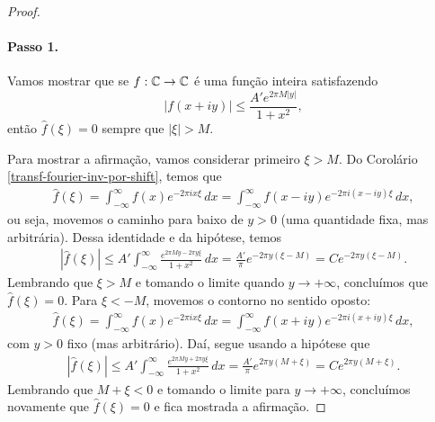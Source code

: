 \begin{proof}
            \paragraph{Passo 1.} Vamos mostrar que se $f:\mathbb{C}\to\mathbb{C}$ é uma
            função inteira satisfazendo
            \begin{equation*}
                |f(x+iy)| \leq \frac{A'e^{2\pi M|y|}}{1+x^2},
            \end{equation*}
            então $\widehat{f}(\xi) = 0$ sempre que $|\xi| > M$.
            
            Para mostrar a afirmação, vamos considerar primeiro $\xi>M$.
            Do Corolário \ref{transf-fourier-inv-por-shift}, temos que
            \begin{align*}
                \widehat{f}(\xi) 
                = \int_{-\infty}^{\infty} f(x)e^{-2\pi ix\xi} \, dx
                = \int_{-\infty}^{\infty} f(x-iy)e^{-2\pi i(x-iy)\xi} \, dx,
            \end{align*}
            ou seja, movemos o caminho para baixo de $y>0$ (uma quantidade
            fixa, mas arbitrária). Dessa identidade e da hipótese, temos
            \begin{align*}
                |\widehat{f}(\xi)| 
                \leq A'\int_{-\infty}^{\infty} \frac{ e^{2\pi My 
                - 2\pi y\xi}}{1+x^2} \, dx 
                = \frac{A'}{\pi}e^{-2\pi y(\xi - M)}
                = Ce^{-2\pi y(\xi - M)}.
            \end{align*}
            Lembrando que $\xi>M$ e tomando o limite quando $y\to +\infty$,
            concluímos que $\widehat{f}(\xi) = 0$. Para $\xi<-M$, movemos
            o contorno no sentido oposto:
            \begin{align*}
                \widehat{f}(\xi) 
                = \int_{-\infty}^{\infty} f(x)e^{-2\pi ix\xi} \, dx
                = \int_{-\infty}^{\infty} f(x+iy)e^{-2\pi i(x+iy)\xi} \, dx,
            \end{align*}
            com $y>0$ fixo (mas arbitrário). Daí, segue usando a hipótese que
            \begin{align*}
                |\widehat{f}(\xi)| 
                \leq A'\int_{-\infty}^{\infty} \frac{ e^{2\pi My 
                + 2\pi y\xi}}{1+x^2} \, dx 
                = \frac{A'}{\pi}e^{2\pi y(M + \xi)}
                = Ce^{2\pi y(M +\xi)}.
            \end{align*}
            Lembrando que $M + \xi < 0$ e tomando o limite para $y\to +\infty$,
            concluímos novamente que $\widehat{f}(\xi) = 0$ e fica mostrada
            a afirmação.

\end{proof}
